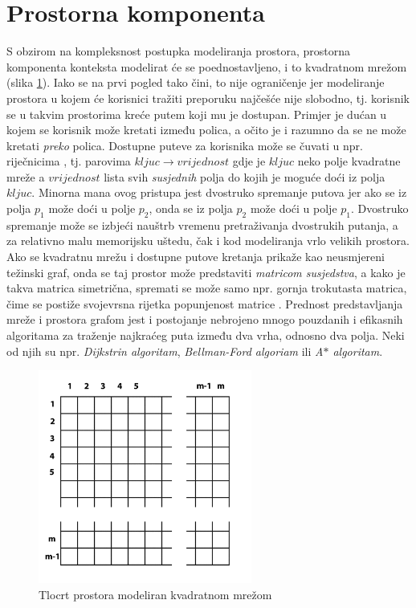 \documentclass[times, utf8, diplomski, numeric]{fer}
\begin{document}
\section{Prostorna komponenta}

S obzirom na kompleksnost postupka modeliranja prostora, prostorna komponenta
konteksta modelirat će se poednostavljeno, i to kvadratnom mrežom
(slika \ref{fig:StoreGrid}). Iako se na prvi pogled tako čini, to nije
ograničenje jer modeliranje prostora u kojem će korisnici tražiti preporuku
najčešće nije slobodno, tj. korisnik se u takvim prostorima kreće putem koji mu
je dostupan. Primjer je dućan u kojem se korisnik može kretati između polica, a
očito je i razumno da se ne može kretati \emph{preko} polica.
Dostupne puteve za korisnika može se čuvati u npr. riječnicima
, tj. parovima $kljuc \rightarrow vrijednost$ gdje je $kljuc$
neko polje kvadratne mreže a $vrijednost$ lista svih \emph{susjednih} polja do
kojih je moguće doći iz polja $kljuc$. Minorna mana ovog pristupa jest
dvostruko spremanje putova jer ako se iz polja $p_1$ može doći u polje $p_2$,
onda se iz polja $p_2$ može doći u polje $p_1$. Dvostruko spremanje može se
izbjeći nauštrb vremenu pretraživanja dvostrukih putanja, a za relativno malu
memorijsku uštedu, čak i kod modeliranja vrlo velikih prostora.
Ako se kvadratnu mrežu i dostupne putove kretanja prikaže kao neusmjereni
težinski graf, onda se taj prostor može predstaviti \emph{matricom
susjedstva}, a kako je takva matrica simetrična, spremati se može samo npr.
gornja trokutasta matrica, čime se postiže svojevrsna rijetka popunjenost
matrice .
Prednost predstavljanja mreže i prostora grafom jest i postojanje nebrojeno
mnogo pouzdanih i efikasnih algoritama za traženje najkraćeg puta između dva
vrha, odnosno dva polja. Neki od njih su npr. \emph{Dijkstrin algoritam},
\emph{Bellman-Ford algoriam} ili \emph{A$\ast$ algoritam}.

\begin{figure}[!htb]
	\centering
	\includegraphics[width=7cm]{images/grid.png}
	\caption{Tlocrt prostora modeliran kvadratnom mrežom}
	\label{fig:StoreGrid}
\end{figure}
\end{document}
